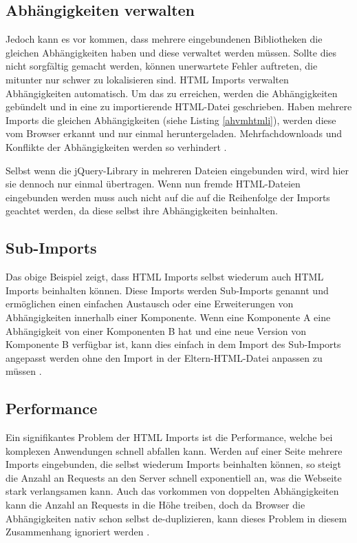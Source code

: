 \subsection{Abhängigkeiten verwalten}\label{abhuxe4ngigkeiten-verwalten}

Jedoch kann es vor kommen, dass mehrere eingebundenen Bibliotheken die gleichen Abhängigkeiten haben und diese verwaltet werden müssen. Sollte dies nicht sorgfältig gemacht werden, können unerwartete Fehler auftreten, die mitunter nur schwer zu lokalisieren sind. \ac{HTML} Imports verwalten Abhängigkeiten automatisch. Um das zu erreichen, werden die Abhängigkeiten gebündelt und in eine zu importierende \ac{HTML}-Datei geschrieben. Haben mehrere Imports die gleichen Abhängigkeiten (siehe Listing \ref{ahvmhtmli}), werden diese vom Browser erkannt und nur einmal heruntergeladen. Mehrfachdownloads und Konflikte der Abhängigkeiten werden so verhindert \cite{citeulike:13853700}.



Selbst wenn die jQuery-Library in mehreren Dateien eingebunden wird, wird hier sie dennoch nur einmal übertragen. Wenn nun fremde \ac{HTML}-Dateien eingebunden werden muss auch nicht auf die auf die Reihenfolge der Imports geachtet werden, da diese selbst ihre Abhängigkeiten beinhalten.


\subsection{Sub-Imports}\label{sub-imports}

Das obige Beispiel zeigt, dass \ac{HTML} Imports selbst wiederum auch \ac{HTML} Imports beinhalten können. Diese Imports werden Sub-Imports genannt und ermöglichen einen einfachen Austausch oder eine Erweiterungen von Abhängigkeiten innerhalb einer Komponente. Wenn eine Komponente A eine Abhängigkeit von einer Komponenten B hat und eine neue Version von Komponente B verfügbar ist, kann dies einfach in dem Import des Sub-Imports angepasst werden ohne den Import in der Eltern-\ac{HTML}-Datei anpassen zu müssen \cite{citeulike:13853647}.


\subsection{Performance}\label{html-import-performance}

Ein signifikantes Problem der \ac{HTML} Imports ist die Performance, welche bei komplexen Anwendungen schnell abfallen kann. Werden auf einer Seite mehrere Imports eingebunden, die selbst wiederum Imports beinhalten können, so steigt die Anzahl an Requests an den Server schnell exponentiell an, was die Webseite stark verlangsamen kann. Auch das vorkommen von doppelten Abhängigkeiten kann die Anzahl an Requests in die Höhe treiben, doch da Browser die Abhängigkeiten nativ schon selbst de-duplizieren, kann dieses Problem in diesem Zusammenhang ignoriert werden \cite{citeulike:13853714}.

